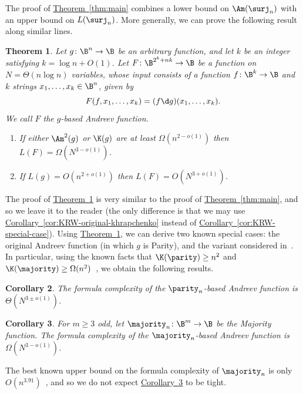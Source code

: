 \documentclass[11pt]{article}
\numberwithin{equation}{section}
\newtheorem{theorem}{Theorem}[section]
\newtheorem{corollary}[theorem]{Corollary}
\theoremstyle{definition}
\theoremstyle{plain}
\newcommand{\expref}[2]{\hyperref[#2]{#1~\ref{#2}}}
\theoremstyle{definition}\newtheorem{notation}[theorem]{Notation}\theoremstyle{plain}
\begin{document}
The proof of \expref{Theorem}{thm:main} combines a lower bound on $\Am(\surj_{n})$
with an upper bound on $L(\surj_{n})$. More generally, we can prove
the following result along similar lines. 
\begin{theorem}
\label{thm:andreev-general}Let $g\colon\B^{n}\to\B$ be an arbitrary
function, and let $k$ be an integer satisfying $k=\log n+O(1)$.
Let $F\colon\B^{2^{k}+nk}\to\B$ be a function on $N=\Theta(n\log n)$
variables, whose input consists of a function $f\colon\B^{k}\to\B$
and $k$ strings $x_{1},\ldots,x_{k}\in\B^{n}$, given by 
\[
F(f,x_{1},\ldots,x_{k})=(f\d g)(x_{1},\ldots,x_{k}).
\]
We call $F$ the \emph{$g$-based Andreev function.} 
\begin{enumerate}
\item If either $\Am^{2}(g)$ or $\K(g)$ are at least $\Omega(n^{2-o(1)})$
then $L(F)=\Omega(N^{3-o(1)})$. 
\item If $L(g)=O(n^{2+o(1)})$ then $L(F)=O(N^{3+o(1)})$. 
\end{enumerate}
\end{theorem}

The proof of \expref{Theorem}{thm:andreev-general} is very similar to the proof
of \expref{Theorem}{thm:main}, and so we leave it to the reader (the only difference
is that we may use \expref{Corollary}{cor:KRW-original-khrapchenko} instead of \expref{Corollary}{cor:KRW-special-case}).
Using \expref{Theorem}{thm:andreev-general}, we can derive two known special
cases: the original Andreev function (in which $g$ is Parity), and
the variant considered in~\cite{GTN19}. In particular, using the
known facts that $\K(\parity)\ge n^{2}$ and $\K(\majority)\ge\Omega(n^{2})$~\cite{K72},
we obtain the following results. 
\begin{corollary}
\label{cor:parity}The formula complexity of the $\parity_{n}$-based
Andreev function is $\Theta(N^{3\pm o(1)})$. 
\end{corollary}

\begin{corollary}
\label{cor:majority} For $m\geq3$ odd, let $\majority_{n}\colon\B^{m}\to\B$
be the Majority function. The formula complexity of the $\majority_{n}$-based
Andreev function is $\Omega(N^{3-o(1)})$. 
\end{corollary}

The best known upper bound on the formula complexity of $\majority_{n}$
is only $O(n^{3.91})$~\cite{S16}, and so we do not expect 
\expref{Corollary}{cor:majority} to be tight.

%
\end{document}
